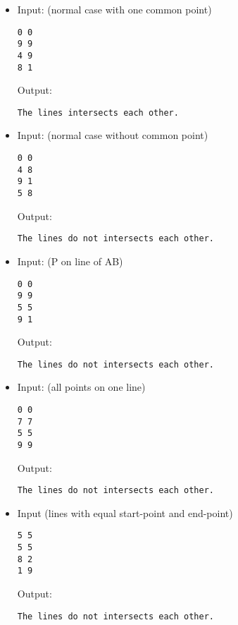 \documentclass[a4paper,10pt]{article}
\begin{document}
\begin{itemize}

\item Input: (normal case with one common point)
\begin{lstlisting}[style = stdio]
0 0
9 9
4 9
8 1
\end{lstlisting}

  Output:
\begin{lstlisting}[style = stdio]
The lines intersects each other.
\end{lstlisting}


\item Input: (normal case without common point)
\begin{lstlisting}[style = stdio]
0 0
4 8
9 1
5 8
\end{lstlisting}

  Output:
\begin{lstlisting}[style = stdio]
The lines do not intersects each other.
\end{lstlisting}


\item Input: (P on line of AB)
\begin{lstlisting}[style = stdio]
0 0
9 9
5 5
9 1
\end{lstlisting}

  Output:
\begin{lstlisting}[style = stdio]
The lines do not intersects each other.
\end{lstlisting}


\item Input: (all points on one line)
\begin{lstlisting}[style = stdio]
0 0
7 7
5 5
9 9
\end{lstlisting}

  Output:
\begin{lstlisting}[style = stdio]
The lines do not intersects each other.
\end{lstlisting}


\item Input (lines with equal start-point and end-point)
\begin{lstlisting}[style = stdio]
5 5
5 5
8 2
1 9 
\end{lstlisting}

  Output:
\begin{lstlisting}[style = stdio]
The lines do not intersects each other.
\end{lstlisting}

\end{itemize}
\end{document}
